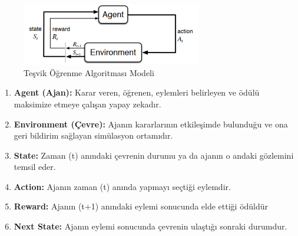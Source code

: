 \documentclass{article}
\begin{document}
\begin{figure}[h]
    \begin{center}
        \includegraphics[width=0.7\textwidth]{model.png}
    \end{center}
      \caption{Teşvik Öğrenme Algoritması Modeli \cite{model}}
\end{figure}

\begin{enumerate}
    \item \textbf{Agent (Ajan):} Karar veren, öğrenen,  eylemleri belirleyen ve ödülü maksimize etmeye çalışan yapay zekadır.

    \item \textbf{Environment (Çevre):} Ajanın kararlarının etkileşimde bulunduğu ve ona geri bildirim sağlayan simülasyon ortamıdır.

    \item \textbf{State:} Zaman (t) anındaki çevrenin durumu ya da ajanın o andaki gözlemini temsil eder.

    \item \textbf{Action:} Ajanın zaman (t) anında yapmayı seçtiği eylemdir.

    \item \textbf{Reward:} Ajanın (t+1) anındaki eylemi sonucunda elde ettiği ödüldür

    \item \textbf{Next State:} Ajanın eylemi sonucunda çevrenin ulaştığı sonraki durumdur.
\end{enumerate}

\newpage
\end{document}
